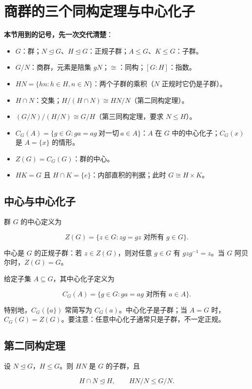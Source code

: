 \section{商群的三个同构定理与中心化子}


\textbf{本节用到的记号，先一次交代清楚}：

\begin{itemize}
\item $G$：群；$N\trianglelefteq G$、$H\trianglelefteq G$：正规子群；$A\le G$、$K\le G$：子群。
\item $G/N$：商群，元素是陪集 $gN$；$\cong$：同构；$[G:H]$：指数。
\item $HN=\{hn:h\in H,n\in N\}$：两个子群的乘积（$N$ 正规时它仍是子群）。
\item $H\cap N$：交集；$H/(H\cap N)\cong HN/N$（第二同构定理）。
\item $(G/N)/(H/N)\cong G/H$（第三同构定理，要求 $N\le H$）。
\item $C_G(A)=\{g\in G:ga=ag\ \text{对一切}\ a\in A\}$：$A$ 在 $G$ 中的中心化子；$C_G(x)$ 是 $A=\{x\}$ 的情形。
\item $Z(G)=C_G(G)$：群的中心。
\item $HK=G$ 且 $H\cap K=\{e\}$：内部直积的判据；此时 $G\cong H\times K$。
\end{itemize}


\subsection{中心与中心化子}


群 $G$ 的中心定义为

\[
Z(G)=\{z\in G:zg=gz\text{ 对所有 }g\in G\}.
\]

中心是 $G$ 的正规子群：若 $z\in Z(G)$，则对任意 $g\in G$ 有 $gzg^{-1}=z$。当 $G$ 阿贝尔时，$Z(G)=G$。

给定子集 $A\subseteq G$，其中心化子定义为

\[
C_G(A)=\{g\in G:ga=ag\text{ 对所有 }a\in A\}.
\]

特别地，$C_G(\{a\})$ 常简写为 $C_G(a)$。中心化子是子群；当 $A=G$ 时，$C_G(G)=Z(G)$。要注意：任意中心化子通常只是子群，不一定正规。

\subsection{第二同构定理}


设 $N\trianglelefteq G$，$H\le G$。则 $HN$ 是 $G$ 的子群，且

\[
H\cap N\trianglelefteq H,
\qquad HN/N\le G/N.
\]

